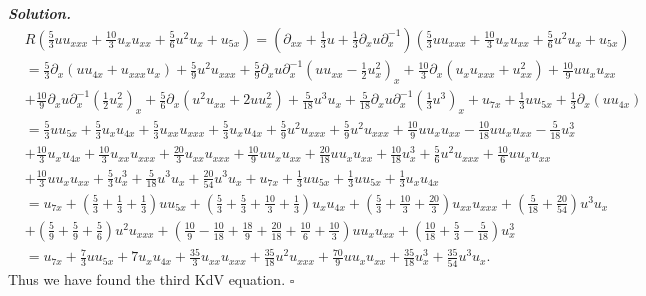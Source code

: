 \documentclass[12pt]{report}
\newenvironment{solution}[1][\it{Solution}]{\textbf{#1. } }{$\square$}
\newcommand{\paren}[1]{{\left(#1\right)}} %
\begin{document}
\begin{solution}
    \begin{align*}
        &R\paren{\frac{5}{3}uu_{xxx} + \frac{10}{3}u_xu_{xx} + \frac{5}{6}u^2u_x + u_{5x}} = \paren{\partial_{xx}+\frac{1}{3}u+ \frac{1}{3}\partial_x u\partial_x^{-1}}\paren{\frac{5}{3}uu_{xxx} + \frac{10}{3}u_xu_{xx} + \frac{5}{6}u^2u_x + u_{5x}}\\
        &= \frac{5}{3}\partial_x (uu_{4x} + u_{xxx}u_x) + \frac{5}{9}u^2u_{xxx} + \frac{5}{9}\partial_x u \partial_x^{-1}(uu_{xx} - \frac{1}{2}u_x^2)_x + \frac{10}{3}\partial_x(u_xu_{xxx} + u_{xx}^2) + \frac{10}{9}uu_xu_{xx}\\ 
        &+ \frac{10}{9}\partial_x u \partial_x^{-1}\paren{\frac{1}{2}u_x^2}_x + \frac{5}{6}\partial_x(u^2u_{xx} + 2uu_x^2) + \frac{5}{18}u^3u_x + \frac{5}{18}\partial_x u \partial_x^{-1}\paren{\frac{1}{3}u^3}_x + u_{7x} + \frac{1}{3}uu_{5x} + \frac{1}{3}\partial_x(uu_{4x})\\
        &= \frac{5}{3}uu_{5x} + \frac{5}{3}u_xu_{4x} + \frac{5}{3}u_{xx}u_{xxx} + \frac{5}{3}u_xu_{4x} + \frac{5}{9}u^2u_{xxx} + \frac{5}{9}u^2u_{xxx} + \frac{10}{9}uu_xu_{xx} - \frac{10}{18}uu_xu_{xx} - \frac{5}{18}u_x^3 \\
        &+ \frac{10}{3}u_xu_{4x} + \frac{10}{3}u_{xx}u_{xxx} + \frac{20}{3}u_{xx}u_{xxx} + \frac{10}{9}uu_xu_{xx} + \frac{20}{18}uu_xu_{xx} + \frac{10}{18}u_x^3 + \frac{5}{6}u^2u_{xxx} + \frac{10}{6}uu_xu_{xx}\\ 
        &+ \frac{10}{3}uu_xu_{xx} + \frac{5}{3}u^3_x + \frac{5}{18}u^3u_x + \frac{20}{54}u^3u_x + u_{7x} + \frac{1}{3}uu_{5x} + \frac{1}{3}uu_{5x} + \frac{1}{3}u_xu_{4x}\\
        &=u_{7x} + \paren{\frac{5}{3} + \frac{1}{3} + \frac{1}{3}}uu_{5x} + \paren{\frac{5}{3} + \frac{5}{3} + \frac{10}{3} + \frac{1}{3}}u_xu_{4x} + \paren{\frac{5}{3} + \frac{10}{3} + \frac{20}{3}}u_{xx}u_{xxx} + \paren{\frac{5}{18} + \frac{20}{54}}u^3u_x\\ 
        &+ \paren{\frac{5}{9} + \frac{5}{9} + \frac{5}{6}}u^2u_{xxx} +\paren{\frac{10}{9} - \frac{10}{18} + \frac{18}{9} + \frac{20}{18} + \frac{10}{6} + \frac{10}{3}}uu_xu_{xx} + \paren{\frac{10}{18} + \frac{5}{3}-\frac{5}{18}}u_x^3\\
        &=u_{7x} + \frac{7}{3}uu_{5x} + 7u_xu_{4x} + \frac{35}{3}u_{xx}u_{xxx} + \frac{35}{18}u^2u_{xxx} + \frac{70}{9}uu_xu_{xx} + \frac{35}{18}u_x^3 + \frac{35}{54}u^3u_x.
    \end{align*}
    Thus we have found the third KdV equation.
\end{solution}
\end{document}
